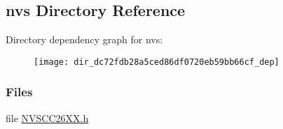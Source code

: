\subsection{nvs Directory Reference}
\label{dir_dc72fdb28a5ced86df0720eb59bb66cf}
Directory dependency graph for nvs\+:
\nopagebreak
\begin{figure}[H]
\begin{center}
\leavevmode
\texttt{[image: dir\_dc72fdb28a5ced86df0720eb59bb66cf\_dep]}
\end{center}
\end{figure}
\subsubsection*{Files}
\begin{DoxyCompactItemize}
\item 
file \hyperlink{_n_v_s_c_c26_x_x_8h}{N\+V\+S\+C\+C26\+X\+X.\+h}
\end{DoxyCompactItemize}
